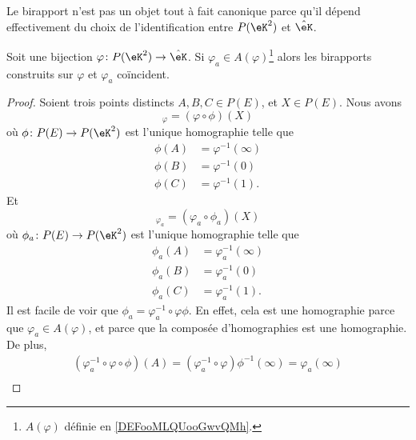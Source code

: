 Le birapport n'est pas un objet tout à fait canonique parce qu'il dépend effectivement du choix de l'identification entre \( P(\eK^2)\) et \( \hat\eK\).

\begin{proposition}     \label{PROPooTFMQooIOQGvs}
    Soit une bijection \( \varphi\colon P(\eK^2)\to \hat\eK\). Si \( \varphi_a\in A(\varphi)\)\footnote{\( A(\varphi)\) définie en \ref{DEFooMLQUooGwvQMh}.} alors les birapports construits sur \( \varphi\) et \( \varphi_a\) coïncident.
\end{proposition}

\begin{proof}
    Soient trois points distincts \( A,B,C\in P(E)\), et \( X\in P(E)\). Nous avons
    \begin{equation}
        [A,B,C,X]_{\varphi}=(\varphi\circ\phi)(X)
    \end{equation}
    où \( \phi\colon P(E)\to P(\eK^2)\) est l'unique homographie telle que
    \begin{subequations}
        \begin{align}
            \phi(A)&=\varphi^{-1}(\infty)\\
            \phi(B)&=\varphi^{-1}(0)\\
            \phi(C)&=\varphi^{-1}(1).
        \end{align}
    \end{subequations}
    Et 
    \begin{equation}
        [A,B,C,X]_{\varphi_a}=(\varphi_a\circ\phi_a)(X)
    \end{equation}
    où \( \phi_a\colon P(E)\to P(\eK^2)\) est l'unique homographie telle que
    \begin{subequations}
        \begin{align}
            \phi_a(A)&=\varphi_a^{-1}(\infty)\\
            \phi_a(B)&=\varphi_a^{-1}(0)\\
            \phi_a(C)&=\varphi_a^{-1}(1).
        \end{align}
    \end{subequations}
    Il est facile de voir que \( \phi_a=\varphi_a^{-1}\circ\varphi\phi\). En effet, cela est une homographie parce que \( \varphi_a\in A(\varphi)\), et parce que la composée d'homographies est une homographie. De plus,
    \begin{subequations}
        \begin{align}
            (\varphi_a^{-1}\circ\varphi\circ\phi)(A)=(\varphi_a^{-1}\circ\varphi)\phi^{-1}(\infty)=\varphi_a(\infty)\\

\end{align}
\end{subequations}
\end{proof}
